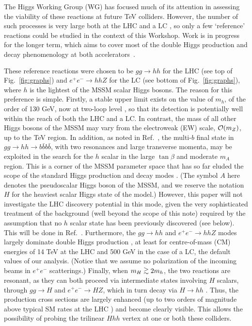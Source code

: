 The Higgs Working Group (WG) has focused much of its attention in assessing
the viability of these reactions at future TeV colliders. However, the
number of such processes is very large both at the LHC and a LC
\cite{ee,pp}, so only a few `reference' reactions could be studied in
the context of this Workshop.  Work is in progress for the
longer term, which aims to cover most of the double Higgs production
and decay phenomenology at both accelerators~\cite{more}.

These reference reactions were chosen to be $gg\to hh$ for the LHC
(see top of Fig.~\ref{fig:graphs}) and $e^+e^-\to h h Z$ for the LC
(see bottom of Fig.~\ref{fig:graphs}), where $h$ is the lightest of the
MSSM scalar Higgs bosons.  The reason for this preference is simple.
Firstly, a stable upper limit exists on the value of $m_h$, of the
order of 130 GeV, now at two-loop level \cite{twoloop}, so that
its detection is potentially well within the reach of both the LHC and
a LC.  In contrast, the mass of all other Higgs bosons of the MSSM may
vary from the electroweak (EW) scale, ${\cal O}(m_Z)$, up to the TeV
region.  In addition, as noted in Ref.~\cite{pp}, the multi-$b$ final
state in $gg\to hh\to b\bar b b\bar b$, with two resonances and large
transverse momenta, may be exploited in the search for the $h$ scalar
in the large $\tan\beta$ and moderate $m_A$ region. This is a corner
of the MSSM parameter space that has so far eluded the scope of the
standard Higgs production and decay modes \cite{standard}.  (The
symbol $A$ here denotes the pseudoscalar Higgs boson of the MSSM, and
we reserve the notation $H$ for the heaviest scalar Higgs state of the
model.)
However, this paper will not investigate the LHC discovery potential
in this mode, given the very sophisticated treatment of the background
(well beyond the scope of this note) required by the assumption
that no $h$ scalar state has been previously discovered (see below).
This will be done in Ref.~\cite{more}.  Furthermore, the $gg\to hh$
and $e^+e^-\to hhZ$ modes largely dominate double Higgs production
\cite{ee,pp}, at least for centre-of-mass (CM) energies of 14 TeV
at the LHC and 500 GeV in the case of a LC, the default values of
our analysis. (Notice that we assume no
polarization of the incoming beams in $e^+e^-$ scatterings.)
 Finally, when $m_H\OOrd2m_h$, the two reactions are
resonant, as they can both proceed via intermediate states involving
$H$ scalars, through $gg\to H$ and $e^+e^-\to HZ$, which in turn decay
via $H\to hh$ \cite{BRs}. Thus, the production cross sections are
largely enhanced \cite{ee,pp} (up to two orders of magnitude above
typical SM rates at the LHC \cite{pp}) and become clearly visible. 
This allows the possibility of probing the
trilinear $Hhh$ vertex at one or both these colliders.

